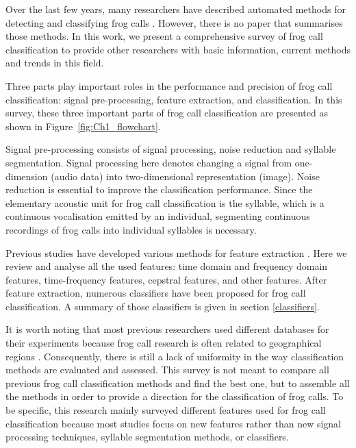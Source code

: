 Over the last few years, many researchers have described automated methods for detecting and classifying frog calls \citep{huang2008realization, huang2009frog, han2011acoustic,chen2012automatic, Gingras2013, camacho2013automatic, Huang20141}. However, there is no paper that summarises those methods. In this work, we present a comprehensive survey of frog call classification to provide other researchers with basic information, current methods and trends in this field. 

Three parts play important roles in the performance and precision of frog call classification: signal pre-processing, feature extraction, and classification. In this survey, these three important parts of frog call classification are presented as shown in Figure~\ref{fig:Ch1_flowchart}. 




Signal pre-processing consists of signal processing, noise reduction and syllable segmentation. Signal processing here denotes changing a signal from one-dimension (audio data) into two-dimensional representation (image). Noise reduction is essential to improve the classification performance. Since the elementary acoustic unit for frog call classification is the syllable, which is a continuous vocalisation emitted by an individual, segmenting continuous recordings of frog calls into individual syllables is necessary. 

Previous studies have developed various methods for feature extraction \citep{huang2008realization, huang2009frog, han2011acoustic, chen2012automatic, Gingras2013, camacho2013automatic, Huang20141}. Here we review and analyse all the used features: time domain and frequency domain features, 
time-frequency features, cepstral features, and other features. After feature extraction, numerous classifiers have been proposed for frog call classification. A summary of those classifiers is given in section \ref{classifiers}.


It is worth noting that most previous researchers used different databases for their experiments because frog call research is often related to geographical regions \citep{jang2011geographic}. Consequently, there is still a lack of uniformity in the way classification methods are evaluated and assessed. This survey is not meant to compare all previous frog call classification methods and find the best one, but to assemble all the methods in order to provide a direction for the classification of frog calls. To be specific, this research mainly surveyed different features used for frog call classification because most studies focus on new features rather than new signal processing techniques, syllable segmentation methods, or classifiers.

